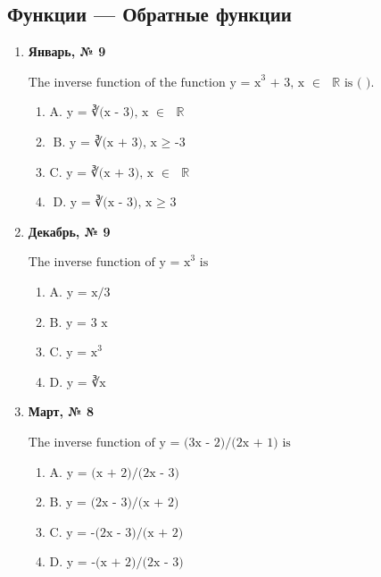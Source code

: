 \subsection*{Функции — Обратные функции}
\begin{enumerate}
\item \textbf{Январь, № 9} \par \smallskip
$\displaystyle \text{The inverse function of the function y = x}^{3}\text{ + 3, x }\in\text{  }\mathbb{R}\text{ is ( ).}$
\begin{enumerate}
\item $\displaystyle \text{A. y = ∛(x - 3), x }\in\text{  }\mathbb{R}$
\item $\displaystyle \text{B. y = ∛(x + 3), x }\geq\text{  -3}$
\item $\displaystyle \text{C. y = ∛(x + 3), x }\in\text{  }\mathbb{R}$
\item $\displaystyle \text{D. y = ∛(x - 3), x }\geq\text{  3}$
\end{enumerate}
\item \textbf{Декабрь, № 9} \par \smallskip
$\displaystyle \text{The inverse function of y = x}^{3}\text{ is}$
\begin{enumerate}
\item $\displaystyle \text{A. y = x/3}$
\item $\displaystyle \text{B. y = 3 x}$
\item $\displaystyle \text{C. y = x}^{3}$
\item $\displaystyle \text{D. y = ∛x}$
\end{enumerate}
\item \textbf{Март, № 8} \par \smallskip
$\displaystyle \text{The inverse function of y = (3x - 2)/(2x + 1) is}$
\begin{enumerate}
\item $\displaystyle \text{A. y = (x + 2)/(2x - 3)}$
\item $\displaystyle \text{B. y = (2x - 3)/(x + 2)}$
\item $\displaystyle \text{C. y = -(2x - 3)/(x + 2)}$
\item $\displaystyle \text{D. y = -(x + 2)/(2x - 3)}$
\end{enumerate}
\end{enumerate}

